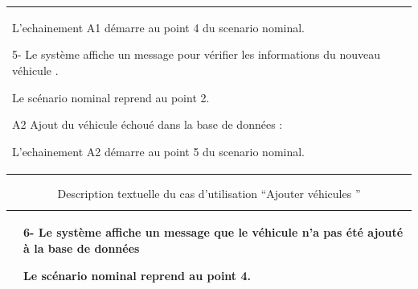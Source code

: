 \begin{table}[H]
\begin{tabular}{|p{4cm}|p{9cm}|}
    L'echainement A1 démarre au point 4 du scenario nominal.\newline

    5- Le système affiche un message pour vérifier les informations du nouveau véhicule .\newline

    Le scénario nominal reprend au point 2. \newline

    A2 Ajout du véhicule échoué dans la base de données :\newline

    L'echainement A2 démarre au point 5 du scenario nominal.                                                                \\
  \end{tabular}

\end{table}



\begin{table}[H]
  \centering
  \renewcommand{\arraystretch}{1.1} %
  \begin{tabular}{|p{4cm}|p{9cm}|}


     & 6- Le système affiche un message que le véhicule n'a pas été ajouté à la base de données\newline

    Le scénario nominal reprend au point 4.                                                             \\

    \hline
  \end{tabular}
  \caption{Description textuelle du cas d’utilisation “Ajouter véhicules ”}

\end{table}

